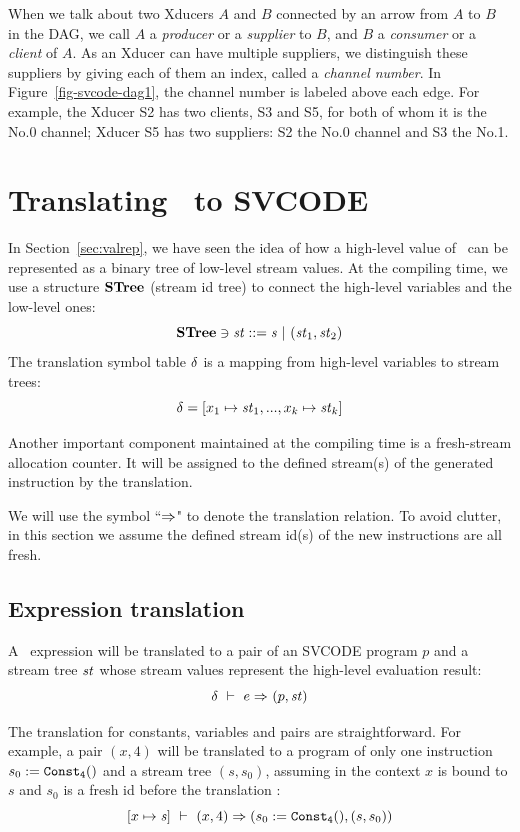 When we talk about two Xducers $A$ and $B$ connected by an arrow from $A$ to $B$ in the DAG, we call $A$ a \emph{producer} or a \emph{supplier} to $B$, and $B$ a \emph{consumer} or a \emph{client} of $A$. 
As an Xducer can have multiple suppliers, we distinguish these suppliers by giving each of them an index, called a \emph{channel number}. 
In Figure~\ref{fig-svcode-dag1}, the channel number is labeled above each edge. 
For example, the Xducer S2 has two clients, S3 and S5, for both of whom it is the No.0 channel;  Xducer S5 has two suppliers: S2 the No.0 channel and S3 the No.1. \\



\section{Translating \mysnesl \ to SVCODE}
In Section~\ref{sec:valrep}, we have seen the idea of how a high-level value of \mysnesl \ can be represented as a binary tree of low-level stream values.
At the compiling time, we use a structure $\mathbf{STree}$ (stream id tree) to connect the high-level variables and the low-level ones: 
$$ \STree \ni \st ::= \s \ | \ (\st_1,\st_2) $$
The translation symbol table $\delta$ is a mapping from high-level variables to stream trees:
 $$\del = [x_1 \|-> \st_1,..., x_k \|-> {\st_k}] $$ 

Another important component maintained at the compiling time is a fresh-stream allocation counter. 
It will be assigned to the defined stream(s) of the generated instruction by the translation.

We will use the symbol ``$\Rightarrow$" to denote the translation relation. 
To avoid clutter, in this section we assume the defined stream id(s) of the new instructions are all fresh.

 
\subsection{Expression translation}


A \mysnesl \ expression will be translated to a pair of an SVCODE program $p$ and a stream tree $\mathit{st}$ whose stream values represent the high-level evaluation result:
$$ \delta \ \vdash\  e \Rightarrow^{}_{} (p,\mathit{st})$$

The translation for constants, variables and pairs are straightforward. For example, a pair $(x,4)$ will be translated to a program of only one instruction $s_0 := \mathtt{Const_{4}()}$ and a stream tree $(s,s_0)$, assuming in the context $x$ is bound to $s$ and $s_0$ is a fresh id before the translation :   
$$[x \|-> \s] \Env (x,4)  \Ra (s_0 := \constaf{4}, (s,s_0))$$ 

